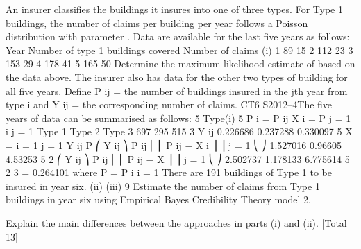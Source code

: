 \documentclass[a4paper,12pt]{article}
\begin{document}
An insurer classifies the buildings it insures into one of three types. For Type 1
buildings, the number of claims per building per year follows a Poisson distribution
with parameter \lambda . Data are available for the last five years as follows:
Year
Number of type 1 buildings covered
Number of claims
(i)
1
89
15
2
112
23
3
153
29
4
178
41
5
165
50
Determine the maximum likelihood estimate of \lambda  based on the data above. 
The insurer also has data for the other two types of building for all five years. Define
P ij = the number of buildings insured in the jth year from type i and
Y ij = the corresponding number of claims.
CT6 S2012–4The five years of data can be summarised as follows:
5
Type(i)
5
P i = \sum  P ij
X i = \sum 
P
j = 1 i
j = 1
Type 1
Type 2
Type 3
697
295
515
3
Y ij
0.226686
0.237288
0.330097
5
X = \sum \sum 
i = 1 j = 1
Y ij
P
⎛ Y ij
⎞
\sum  P ij ⎜ ⎜ P ij − X i ⎟ ⎟
j = 1 ⎝
⎠
1.527016
0.96605
4.53253
5
2
⎛ Y ij
⎞
\sum  P ij ⎜ ⎜ P ij − X ⎟ ⎟
j = 1 ⎝
⎠
2.502737
1.178133
6.775614
5
2
3
= 0.264101 where P = \sum  P i
i = 1
There are 191 buildings of Type 1 to be insured in year six.
(ii)
(iii)
9
Estimate the number of claims from Type 1 buildings in year six using
Empirical Bayes Credibility Theory model 2.

Explain the main differences between the approaches in parts (i) and (ii). 
[Total 13]

\end{document}
